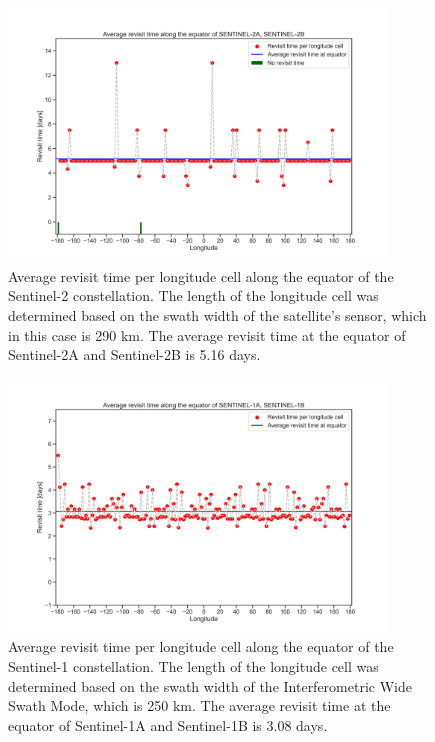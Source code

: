 \begin{figure}
\centering
\includegraphics[width=0.9\textwidth]{Images/revisit_time_of_SENTINEL-2A_SENTINEL-2B.png}
\caption{Average revisit time per longitude cell along the equator of the Sentinel-2 constellation. The length of the longitude cell was determined based on the swath width of the satellite's sensor, which in this case is 290 km. The average revisit time at the equator of Sentinel-2A and Sentinel-2B is 5.16 days.}
\label{revisit_time_of_SENTINEL-2A_SENTINEL-2B}
\end{figure}

\begin{figure}
\centering
\includegraphics[width=0.9\textwidth]{Images/revisit_time_of_SENTINEL-1A_SENTINEL-1B.png}
\caption{Average revisit time per longitude cell along the equator of the Sentinel-1 constellation. The length of the longitude cell was determined based on the swath width of the Interferometric Wide Swath Mode, which is 250 km. The average revisit time at the equator of Sentinel-1A and Sentinel-1B is 3.08 days.}
\label{revisit_time_of_SENTINEL-1A_SENTINEL-1B}
\end{figure}

